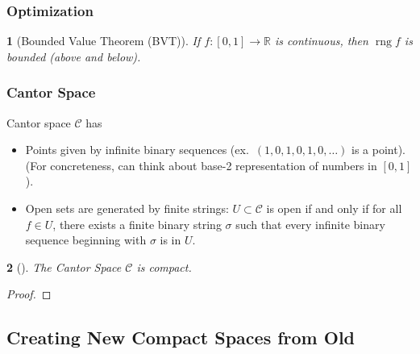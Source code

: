 \documentclass[11pt]{article}
\numberwithin{equation}{section}
\theoremstyle{plain}
\newtheorem{theorem}{\color{ForestGreen}{\textbf{Theorem}}}[section]
\theoremstyle{definition}
\def\ss{\subset}
\newcommand{\1}{\mathbbm 1}
\newcommand{\RR}{\mathbb R}
\newcommand{\cC}{\mathcal C}
\DeclareMathOperator{\range}{rng}
\begin{document}
\subsubsection{Optimization}


\begin{theorem}[Bounded Value Theorem (BVT)]
	If $f:[0,1]\to \RR$ is continuous, then $\range{f}$ is bounded (above and below).
\end{theorem}

\subsubsection{Cantor Space}

Cantor space $\cC$ has 
\begin{itemize}
	\item Points given by infinite binary sequences (ex.\ $(1,0,1,0,1,0,\ldots)$ is a point). (For concreteness, can think about base-2 representation of numbers in $[0,1]$).
	\item Open sets are generated by finite strings: $U \ss \cC$ is open if and only if for all $f \in U$, there exists a finite binary string $\sigma$ such that every infinite binary sequence beginning with $\sigma$ is in $U$.   
\end{itemize}

\begin{theorem}[]
	The Cantor Space $\cC$ is compact. 
\end{theorem}
\begin{proof}
	
\end{proof}




\subsection{Creating New Compact Spaces from Old}
\end{document}
